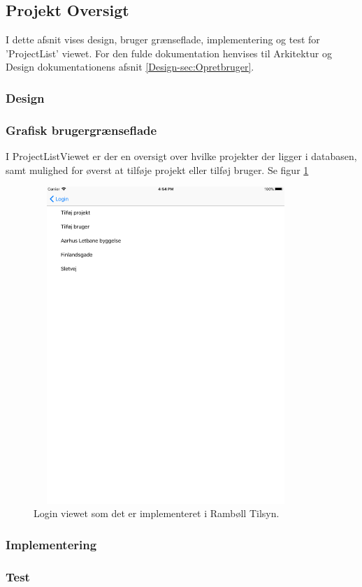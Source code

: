 \subsection{Projekt Oversigt}
I dette afsnit vises design, bruger grænseflade, implementering og test for 'ProjectList' viewet. For den fulde dokumentation henvises til Arkitektur og Design dokumentationens afsnit \ref{Design-sec:Opretbruger}.

\subsubsection{Design}

\clearpage

\subsubsection{Grafisk brugergrænseflade}
I ProjectListViewet er der en oversigt over hvilke projekter der ligger i databasen, samt mulighed for øverst at tilføje projekt eller tilføj bruger. Se figur \ref{fig:ProjectListView}
\begin{figure}[H] %
	\centering
	\includegraphics[height=12cm, width=10cm]{Design/Applikation/ProjektList/ProjectList}
	\caption{Login viewet som det er implementeret i Rambøll Tilsyn.}
	\label{fig:ProjectListView}
\end{figure}

\clearpage

\subsubsection{Implementering}

\subsubsection{Test}

\clearpage